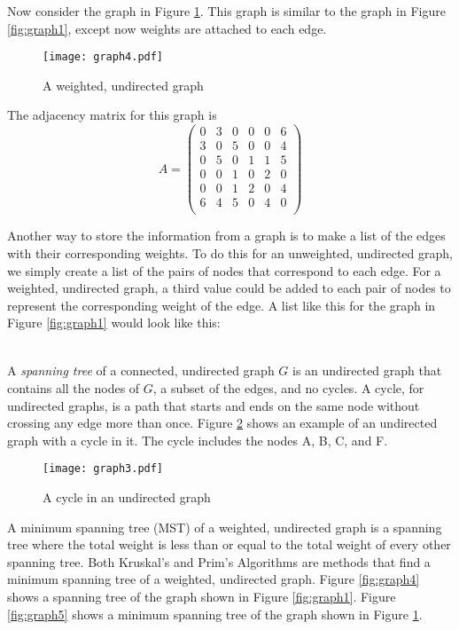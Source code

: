 Now consider the graph in Figure \ref{fig:graph2}.  This graph is similar to the graph in Figure \ref{fig:graph1}, except now weights are attached to each edge.  
\begin{figure}[H]
\texttt{[image: graph4.pdf]}
\caption{A weighted, undirected graph}
\label{fig:graph2}
\end{figure}

The adjacency matrix for this graph is 
\[
A = \begin{pmatrix}
0 & 3 & 0 & 0 & 0 & 6\\
3 & 0 & 5 & 0 & 0 & 4\\
0 & 5 & 0 & 1 & 1 & 5\\
0 & 0 & 1 & 0 & 2 & 0\\
0 & 0 & 1 & 2 & 0 & 4\\
6 & 4 & 5 & 0 & 4 & 0\\
\end{pmatrix}
\]

Another way to store the information from a graph is to make a list of the edges with their corresponding weights.
To do this for an unweighted, undirected graph, we simply create a list of the pairs of nodes that correspond to each edge.
For a weighted, undirected graph, a third value could be added to each pair of nodes to represent the corresponding weight of the edge.
A list like this for the graph in Figure \ref{fig:graph1} would look like this:

\begin{align*}
[('A', 'B'),
 ('B', 'C'),
 ('B', 'F'),
 ('C', 'D'),\\
 ('C', 'E'),
 ('C', 'F'),
 ('D', 'E'),
 ('E', 'F')]
\end{align*}

A \emph{spanning tree} of a connected, undirected graph $G$ is an undirected graph that contains all the nodes of $G$, a subset of the edges, and no cycles.
A cycle, for undirected graphs, is a path that starts and ends on the same node without crossing any edge more than once. Figure \ref{fig:graph3} shows an example of an undirected graph with a cycle in it. The cycle includes the nodes A, B, C, and F.

\begin{figure}[H]
\texttt{[image: graph3.pdf]}
\caption{A cycle in an undirected graph}
\label{fig:graph3}
\end{figure}

A minimum spanning tree (MST) of a weighted, undirected graph is a spanning tree where the total weight is less than or equal to the total weight of every other spanning tree.
Both Kruskal's and Prim's Algorithms are methods that find a minimum spanning tree of a weighted, undirected graph.
Figure \ref{fig:graph4} shows a spanning tree of the graph shown in Figure \ref{fig:graph1}.
Figure \ref{fig:graph5} shows a minimum spanning tree of the graph shown in Figure \ref{fig:graph2}.

